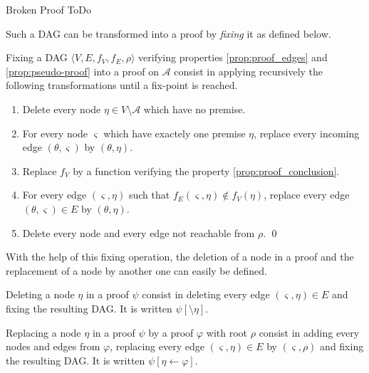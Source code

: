 \documentclass{llncs}
\begin{document}
\begin{definition}{Broken Proof}
ToDo

\end{definition}


Such a DAG can be transformed into a proof by \emph{fixing} it as defined below.

\begin{definition}[Fixing]
Fixing a DAG $\langle V, E, f_V, f_E, \rho \rangle$ verifying properties \ref{prop:proof_edges} and
\ref{prop:pseudo-proof} into a proof on $\mathcal{A}$ consist in applying recursively the following
transformations until a fix-point is reached.
\begin{enumerate}
  \item Delete every node $\eta \in V \setminus \mathcal{A}$ which have no premise.
  \item For every node $\varsigma$ which have exactely one premise $\eta$, replace every incoming
    edge $(\theta,\varsigma)$ by $(\theta,\eta)$.
  \item Replace $f_V$ by a function verifying the property \ref{prop:proof_conclusion}.
  \item For every edge $(\varsigma,\eta)$ such that $f_E(\varsigma,\eta) \notin f_V(\eta)$, replace
    every edge $(\theta,\varsigma) \in E$ by $(\theta,\eta)$.
  \item Delete every node and every edge not reachable from $\rho$.
  \qed
\end{enumerate}
\end{definition}


With the help of this fixing operation, the deletion of a node in a proof and the replacement of a
node by another one can easily be defined.

\begin{definition}
Deleting a node $\eta$ in a proof $\psi$ consist in deleting every edge $(\varsigma,\eta) \in E$ and
fixing the resulting DAG. It is written $\psi[\setminus \eta]$.
\end{definition}

\begin{definition}
Replacing a node $\eta$ in a proof $\psi$ by a proof $\varphi$ with root $\rho$ consist in adding
every nodes and edges from $\varphi$, replacing every edge $(\varsigma,\eta) \in E$ by
$(\varsigma,\rho)$ and fixing the resulting DAG.  It is written $\psi[\eta \leftarrow \varphi]$.
\end{definition}
\end{document}
